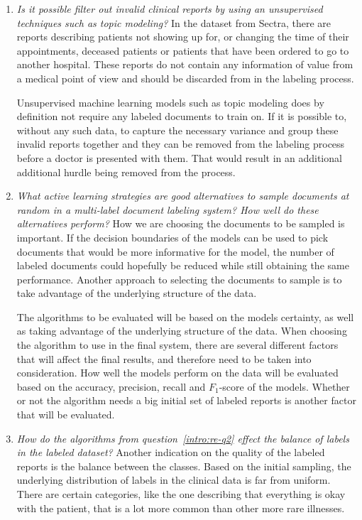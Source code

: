 \begin{enumerate}

\item \textit{Is it possible filter out invalid clinical reports by using an unsupervised techniques such as topic modeling?}
      \newline
      In the dataset from Sectra, there are reports describing patients not showing up for, or changing the time of their appointments, deceased patients or patients that have been ordered to go to another hospital.
      These reports do not contain any information of value from a medical point of view and should be discarded from in the labeling process.

      Unsupervised machine learning models such as topic modeling does by definition not require any labeled documents to train on.
      If it is possible to, without any such data, to capture the necessary variance and group these invalid reports together and they can be removed from the labeling process before a doctor is presented with them.
      That would result in an additional additional hurdle being removed from the process.

\item \label{intro:re-q2} 
      \textit{What active learning strategies are good alternatives to sample documents at random in a multi-label document labeling system? How well do these alternatives perform?}
      \newline
      How we are choosing the documents to be sampled is important.
      If the decision boundaries of the models can be used to pick documents that would be more informative for the model, the number of labeled documents could hopefully be reduced while still obtaining the same performance.
      Another approach to selecting the documents to sample is to take advantage of the underlying structure of the data.

      The algorithms to be evaluated will be based on the models certainty, as well as taking advantage of the underlying structure of the data.
      When choosing the algorithm to use in the final system, there are several different factors that will affect the final results, and therefore need to be taken into consideration.
      How well the models perform on the data will be evaluated based on the accuracy, precision, recall and $F_1$-score of the models.
      Whether or not the algorithm needs a big initial set of labeled reports is another factor that will be evaluated.

  \item \label{intro:re-q3}
      \textit{How do the algorithms from question~\ref{intro:re-q2} effect the balance of labels in the labeled dataset?}
      Another indication on the quality of the labeled reports is the balance between the classes.
      Based on the initial sampling, the underlying distribution of labels in the clinical data is far from uniform.
      There are certain categories, like the one describing that everything is okay with the patient, that is a lot more common than other more rare illnesses.


\end{enumerate}
